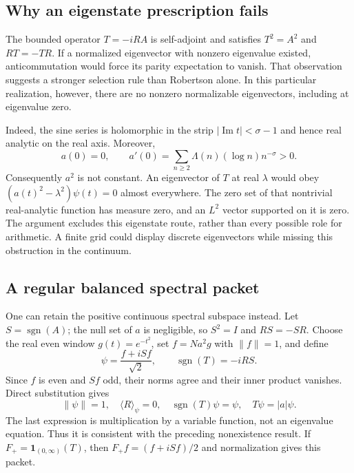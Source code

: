 \subsection{Why an eigenstate prescription fails}

The bounded operator $T=-iRA$ is self-adjoint and satisfies
$T^2=A^2$ and $RT=-TR$. If a normalized eigenvector with nonzero
eigenvalue existed, anticommutation would force its parity expectation
to vanish. That observation suggests a stronger selection rule than
Robertson alone. In this particular realization, however, there are
no nonzero normalizable eigenvectors, including at eigenvalue zero.

Indeed, the sine series is holomorphic in the strip
$|\operatorname{Im}t|<\sigma-1$ and hence real analytic on the real
axis. Moreover,
\begin{equation}
 a(0)=0,\qquad
 a'(0)=\sum_{n\geq2}\Lambda(n)(\log n)n^{-\sigma}>0.
\end{equation}
Consequently $a^2$ is not constant. An eigenvector of $T$ at real
$\lambda$ would obey $(a(t)^2-\lambda^2)\psi(t)=0$ almost
everywhere. The zero set of that nontrivial real-analytic function
has measure zero, and an $L^2$ vector supported on it is zero.
The argument excludes this eigenstate route, rather than every
possible role for arithmetic. A finite grid could display discrete
eigenvectors while missing this obstruction in the continuum.

\subsection{A regular balanced spectral packet}

One can retain the positive continuous spectral subspace instead.
Let $S=\operatorname{sgn}(A)$; the null set of $a$ is negligible,
so $S^2=I$ and $RS=-SR$. Choose the real even window
$g(t)=e^{-t^2}$, set $f=Na^2g$ with $\|f\|=1$, and define
\begin{equation}
 \psi=\frac{f+iSf}{\sqrt2},\qquad
 \operatorname{sgn}(T)=-iRS.
\end{equation}
Since $f$ is even and $Sf$ odd, their norms agree and their inner
product vanishes. Direct substitution gives
\begin{equation}
 \|\psi\|=1,\quad \langle R\rangle_\psi=0,\quad
 \operatorname{sgn}(T)\psi=\psi,\quad T\psi=|a|\psi.
\end{equation}
The last expression is multiplication by a variable function,
not an eigenvalue equation. Thus it is consistent with the preceding
nonexistence result. If $F_+=\mathbf1_{(0,\infty)}(T)$, then
$F_+f=(f+iSf)/2$ and normalization gives this packet.

